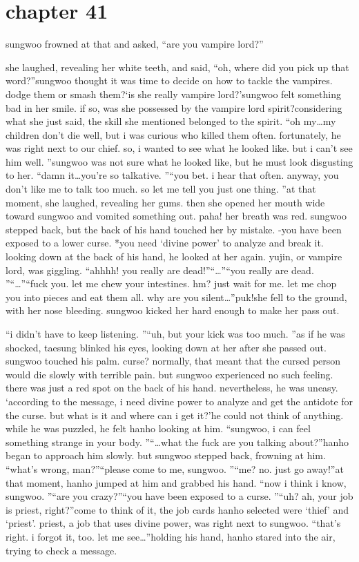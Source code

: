 \section{chapter 41}

                            sungwoo frowned at that and asked, “are you vampire lord?”




she laughed, revealing her white teeth, and said, “oh, where did you pick up that word?”sungwoo thought it was time to decide on how to tackle the vampires.
 dodge them or smash them?‘is she really vampire lord?’sungwoo felt something bad in her smile.
 if so, was she possessed by the vampire lord spirit?considering what she just said, the skill she mentioned belonged to the spirit.
“oh my…my children don’t die well, but i was curious who killed them often.
 fortunately, he was right next to our chief.
 so, i wanted to see what he looked like.
 but i can’t see him well.
”sungwoo was not sure what he looked like, but he must look disgusting to her.
“damn it…you’re so talkative.
”“you bet.
 i hear that often.
 anyway, you don’t like me to talk too much.
 so let me tell you just one thing.
”at that moment, she laughed, revealing her gums.
 then she opened her mouth wide toward sungwoo and vomited something out.
paha! her breath was red.
 sungwoo stepped back, but the back of his hand touched her by mistake.
-you have been exposed to a lower curse.
*you need ‘divine power’ to analyze and break it.
looking down at the back of his hand, he looked at her again.
yujin, or vampire lord, was giggling.
“ahhhh! you really are dead!”“…”“you really are dead.
”“…”“fuck you.
 let me chew your intestines.
 hm? just wait for me.
 let me chop you into pieces and eat them all.
 why are you silent…”puk!she fell to the ground, with her nose bleeding.
 sungwoo kicked her hard enough to make her pass out.

“i didn’t have to keep listening.
”“uh, but your kick was too much.
”as if he was shocked, taesung blinked his eyes, looking down at her after she passed out.
sungwoo touched his palm.
curse? normally, that meant that the cursed person would die slowly with terrible pain.
but sungwoo experienced no such feeling.
 there was just a red spot on the back of his hand.
 nevertheless, he was uneasy.
‘according to the message, i need divine power to analyze and get the antidote for the curse.
 but what is it and where can i get it?’he could not think of anything.
 while he was puzzled, he felt hanho looking at him.
“sungwoo, i can feel something strange in your body.
”“…what the fuck are you talking about?”hanho began to approach him slowly.
 but sungwoo stepped back, frowning at him.
“what’s wrong, man?”“please come to me, sungwoo.
”“me? no.
 just go away!”at that moment, hanho jumped at him and grabbed his hand.
“now i think i know, sungwoo.
”“are you crazy?”“you have been exposed to a curse.
”“uh? ah, your job is priest, right?”come to think of it, the job cards hanho selected were ‘thief’ and ‘priest’.
priest, a job that uses divine power, was right next to sungwoo.
“that’s right.
 i forgot it, too.
 let me see…”holding his hand, hanho stared into the air, trying to check a message.

